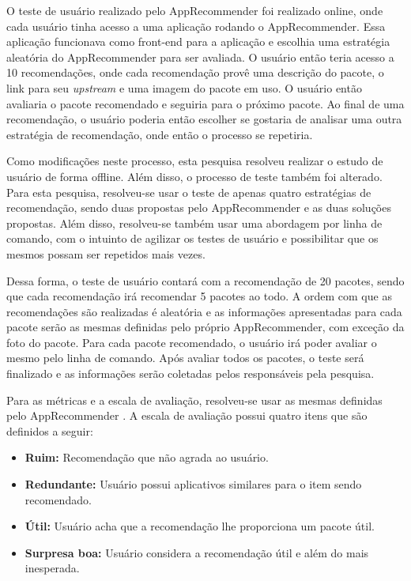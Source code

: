 O teste de usuário realizado pelo AppRecommender foi realizado online, onde cada
usuário tinha acesso a uma aplicação rodando o AppRecommender. Essa aplicação
funcionava como front-end para a aplicação e escolhia uma estratégia aleatória
do AppRecommender para ser avaliada. O usuário então teria acesso a 10
recomendações, onde cada recomendação provê uma descrição do
pacote, o link para seu \textit{upstream} e uma imagem do pacote em uso. O
usuário então avaliaria o pacote recomendado e seguiria para o próximo pacote.
Ao final de uma recomendação, o usuário poderia então escolher se gostaria de
analisar uma outra estratégia de recomendação, onde então o processo se
repetiria.

Como modificações neste processo, esta pesquisa resolveu realizar o estudo de
usuário de forma offline. Além disso, o processo de teste também foi alterado.
Para esta pesquisa, resolveu-se usar o teste de apenas quatro estratégias de
recomendação, sendo duas propostas pelo AppRecommender e as duas soluções
propostas. Além disso, resolveu-se também usar uma abordagem por linha de
comando, com o intuinto de agilizar os testes de usuário e possibilitar que os
mesmos possam ser repetidos mais vezes.

Dessa forma, o teste de usuário contará com a recomendação de 20 pacotes,
sendo que cada recomendação irá recomendar 5 pacotes ao todo. A ordem com que
as recomendações são realizadas é aleatória e as informações apresentadas
para cada pacote serão as mesmas definidas pelo próprio AppRecommender, com
exceção da foto do pacote. Para cada pacote recomendado, o usuário irá poder
avaliar o mesmo pelo linha de comando. Após avaliar todos os pacotes, o teste
será finalizado e as informações serão coletadas pelos responsáveis pela
pesquisa.

Para as métricas e a escala de avaliação, resolveu-se usar as mesmas definidas
pelo AppRecommender \cite{araujo2011apprecommender}. A escala de avaliação
possui quatro itens que são definidos a seguir:

\begin{itemize}
    \item \textbf{Ruim: } Recomendação que não agrada ao usuário.
    \item \textbf{Redundante: } Usuário possui aplicativos similares para o item
        sendo recomendado.
    \item \textbf{Útil: } Usuário acha que a recomendação lhe proporciona um
            pacote útil.
    \item \textbf{Surpresa boa: } Usuário considera a recomendação útil e além
        do mais inesperada.
\end{itemize}

